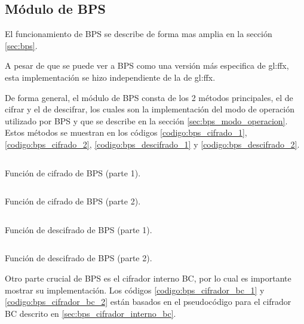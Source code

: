 %
%
%

%
\subsection{Módulo de BPS}

El funcionamiento de BPS se describe de forma mas amplia en la sección
\ref{sec:bps}.

A pesar de que se puede ver a BPS como una versión más especifica de
\gls{gl:ffx}, esta implementación se hizo independiente de la de \gls{gl:ffx}.

De forma general, el módulo de BPS consta de los 2 métodos principales, el
de cifrar y el de descifrar, los cuales son la implementación del modo de
operación utilizado por BPS y que se describe en la sección
\ref{sec:bps_modo_operacion}. Estos métodos se muestran en los códigos
\ref{codigo:bps_cifrado_1}, \ref{codigo:bps_cifrado_2},
\ref{codigo:bps_descifrado_1} y \ref{codigo:bps_descifrado_2}.


\begin{listing}
  \inputminted[firstline=77, lastline=116]
    {c++}{../implementaciones/bps/cifrador_BPS.cpp}
  \caption{Función de cifrado de BPS (parte 1).}
  \label{codigo:bps_cifrado_1}
\end{listing}

\begin{listing}
  \inputminted[firstline=116, lastline=156]
    {c++}{../implementaciones/bps/cifrador_BPS.cpp}
  \caption{Función de cifrado de BPS (parte 2).}
  \label{codigo:bps_cifrado_2}
\end{listing}

\begin{listing}
  \inputminted[firstline=158, lastline=198]
    {c++}{../implementaciones/bps/cifrador_BPS.cpp}
  \caption{Función de descifrado de BPS (parte 1).}
  \label{codigo:bps_descifrado_1}
\end{listing}

\begin{listing}
  \inputminted[firstline=198, lastline=250]
    {c++}{../implementaciones/bps/cifrador_BPS.cpp}
  \caption{Función de descifrado de BPS (parte 2).}
  \label{codigo:bps_descifrado_2}
\end{listing}

Otro parte crucial de BPS es el cifrador interno BC, por lo cual es importante
mostrar su implementación. Los códigos \ref{codigo:bps_cifrador_bc_1} y
\ref{codigo:bps_cifrador_bc_2} están basados en el pseudocódigo para el cifrador
BC descrito en \ref{sec:bps_cifrador_interno_bc}.

